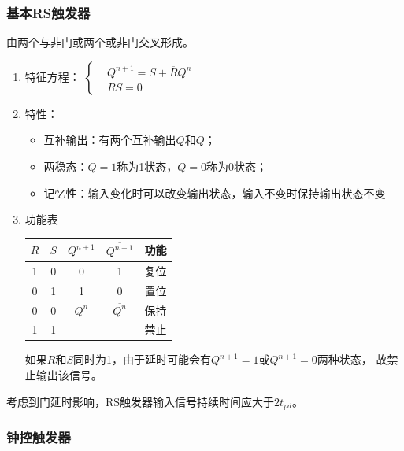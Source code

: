 \documentclass[UTF8,fontset=fandol,zihao=5]{ctexart}
\begin{document}
\subsubsection{基本RS触发器}

由两个与非门或两个或非门交叉形成。

\begin{enumerate}
  
  \item 特征方程：
  $
  \left\{\begin{aligned}
    &Q^{n+1}=S+\overline{R}Q^n \\
    &RS=0
  \end{aligned}\right.
  $

  \item 特性：
  \begin{itemize}
    \item 互补输出：有两个互补输出$Q$和$\overline{Q}$；
    \item 两稳态：$Q=1$称为1状态，$Q=0$称为0状态；
    \item 记忆性：输入变化时可以改变输出状态，输入不变时保持输出状态不变
  \end{itemize}

  \item 功能表
  \begin{table}[htbp]
      \centering
      \begin{tabular}{ccccc}
          \toprule
          $R$ & $S$ & $Q^{n+1}$ & $\overline{Q^{n+1}}$ & 功能 \\
          \midrule
          1 & 0 & 0 & 1 & 复位 \\
          0 & 1 & 1 & 0 & 置位 \\
          0 & 0 & $Q^n$ & $\overline{Q^n}$ & 保持 \\
          1 & 1 & -- & -- & 禁止 \\
          \bottomrule
      \end{tabular}
  \end{table}

  \begin{methodbox}
    如果$R$和$S$同时为1，由于延时可能会有$Q^{n+1}=1$或$Q^{n+1}=0$两种状态，
    故禁止输出该信号。
  \end{methodbox}
\end{enumerate}

考虑到门延时影响，RS触发器输入信号持续时间应大于$2t_{pd}$。

\subsubsection{钟控触发器}
\end{document}
